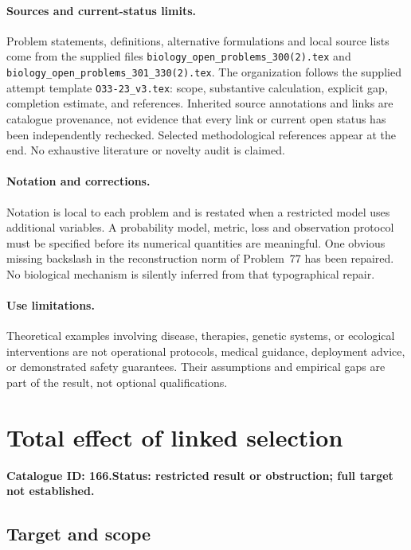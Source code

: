 \documentclass[11pt]{article}
\begin{document}
\paragraph{Sources and current-status limits.}
Problem statements, definitions, alternative formulations and local source lists
come from the supplied files
\texttt{biology\_open\_problems\_300(2).tex} and
\texttt{biology\_open\_problems\_301\_330(2).tex}.
The organization follows the supplied attempt template
\texttt{O33-23\_v3.tex}: scope, substantive calculation, explicit gap,
completion estimate, and references. Inherited source annotations and links are
catalogue provenance, not evidence that every link or current open status has
been independently rechecked. Selected methodological references appear at the
end. No exhaustive literature or novelty audit is claimed.

\paragraph{Notation and corrections.}
Notation is local to each problem and is restated when a restricted model uses
additional variables. A probability model, metric, loss and observation protocol
must be specified before its numerical quantities are meaningful. One obvious
missing backslash in the reconstruction norm of Problem~77 has been repaired.
No biological mechanism is silently inferred from that typographical repair.

\paragraph{Use limitations.}
Theoretical examples involving disease, therapies, genetic systems, or ecological
interventions are not operational protocols, medical guidance, deployment advice,
or demonstrated safety guarantees. Their assumptions and empirical gaps are part
of the result, not optional qualifications.

\setcounter{section}{165}
\section{Total effect of linked selection}
\label{prob:166}
\noindent\textbf{Catalogue ID: 166.}\quad \textbf{Status: restricted result or obstruction; full target not established.}
\subsection{Target and scope}
\end{document}
